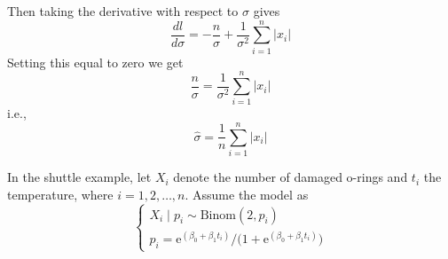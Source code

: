 \documentclass[12pt]{article}
\newenvironment{question}[2][Question]{\begin{trivlist}
\item[\hskip \labelsep {\bfseries #1}\hskip \labelsep {\bfseries #2.}]}{\end{trivlist}}
\begin{document}
\begin{enumerate}[(a)]
Then taking the derivative with respect to $\sigma$ gives
\begin{equation*}
\frac{dl}{d\sigma} = -\frac{n}{\sigma} + \frac{1}{\sigma^2}\sum_{i=1}^n|x_i|
\end{equation*}
Setting this equal to zero we get
\begin{equation*}
\frac{n}{\sigma} = \frac{1}{\sigma^2}\sum_{i=1}^n|x_i|
\end{equation*}
i.e., 
\begin{equation*}
\boxed{\hat \sigma = \frac{1}{n}\sum_{i=1}^n|x_i|}
\end{equation*}

\end{enumerate}
 

\bigskip
\bigskip

\begin{question}{4.3} 
 In the shuttle example, let $X_i$ denote the number of damaged o-rings and $t_i$
the temperature, where $i = 1, 2, \dots, n$. Assume the model as
$$
\begin{cases} 
       X_i \mid p_i \sim \text{Binom}(2, p_i) \\
       p_i = \mathrm{e}^{(\beta_0 + \beta_1 t_i)} /  ( 1 +  {\mathrm{e}^{(\beta_0 + \beta_1 t_i)})}
\end{cases}
$$
\end{question}
\end{document}
